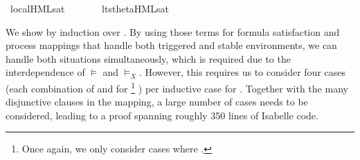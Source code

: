 \begin{isabellebody}
%
\endisatagproof
{\isafoldproof}%
%
\isadelimproof
%
\endisadelimproof
\isanewline
{}\isamarkupfalse%
\ local{\isachardot}{\kern0pt}HML{\isacharunderscore}{\kern0pt}sat\ {\isacharparenleft}{\kern0pt}{\isachardoublequoteopen}{\isacharunderscore}{\kern0pt}\ {\isasymTurnstile}\ {\isacharunderscore}{\kern0pt}{\isachardoublequoteclose}\ {\isacharbrackleft}{\kern0pt}{}{}{\isacharcomma}{\kern0pt}\ {}{}{\isacharbrackright}{\kern0pt}\ {}{}{\isacharparenright}{\kern0pt}\isanewline
{}\isamarkupfalse%
\ lts{\isacharunderscore}{\kern0pt}theta{\isachardot}{\kern0pt}HML{\isacharunderscore}{\kern0pt}sat\ {\isacharparenleft}{\kern0pt}{\isachardoublequoteopen}{\isacharunderscore}{\kern0pt}\ {\isasymTurnstile}\ {\isacharunderscore}{\kern0pt}{\isachardoublequoteclose}\ {\isacharbrackleft}{\kern0pt}{}{}{\isacharcomma}{\kern0pt}\ {}{}{\isacharbrackright}{\kern0pt}\ {}{}{\isacharparenright}{\kern0pt}%
\begin{isamarkuptext}%
We show  by induction over \isa{{\isasymphi}}. By using those terms for formula satisfaction and process mappings that handle both triggered and stable environments, we can handle both situations simultaneously, which is required due to the interdependence of $\vDash$ and $\vDash_X$. However, this requires us to consider four cases (each combination of  and  for %
\footnote{Once again, we only consider cases where .}%
) per inductive case for \isa{{\isasymphi}}. Together with the many disjunctive clauses in the mapping, a large number of cases needs to be considered, leading to a proof spanning roughly 350 lines of Isabelle code.%

\end{isamarkuptext}
\end{isabellebody}
